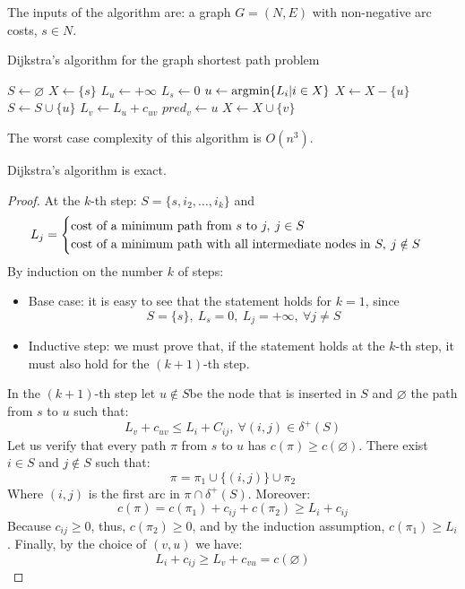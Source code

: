\documentclass[12pt, a4paper]{report}
\begin{document}
    The inputs of the algorithm are: a graph $G = (N, E)$ with non-negative arc costs, $s \in N$. 
    \begin{algorithm}[H]
        \caption{Dijkstra's algorithm for the graph shortest path problem}
            \begin{algorithmic}[1]
                \State $S \leftarrow \varnothing$
                \State $X \leftarrow \{s\}$
                    \State $L_u \leftarrow +\infty$
                \EndFor
                \State $L_s \leftarrow 0$
                    \State $u \leftarrow \textnormal{argmin}\{L_i|i \in X\}$
                    \State $X \leftarrow X-\{u\}$
                    \State $S \leftarrow S \cup \{u\}$
                        \State $L_v \leftarrow L_u+c_{uv}$
                        \State $pred_v \leftarrow u$
                        \State $X \leftarrow X \cup \{v\}$
                    \EndFor
                \EndWhile
            \end{algorithmic}
    \end{algorithm}
    The worst case complexity of this algorithm is $O(n^3)$. 
    \begin{proposition}
        Dijkstra's algorithm is exact. 
    \end{proposition}
    \begin{proof}
        At the $k$-th step: $S = \{s,i_2,\dots,i_k\}$ and 
        \[L_j=
        \begin{cases}
            \textnormal{cost of a minimum path from } s \textnormal{ to } j,\:j \in S \\ 
            \textnormal{cost of a minimum path with all intermediate nodes in } S, \: j \notin S
        \end{cases}
        \]
        By induction on the number $k$ of steps: 
        \begin{itemize}
            \item Base case: it is easy to see that the statement holds for $k = 1$, since 
                \[S=\{s\},\: L_s=0,\: L_j= +\infty,\: \forall j \neq S \]
            \item Inductive step: we must prove that, if the statement holds at the $k$-th step, it must also hold for the $(k + 1)$-th step. 
        \end{itemize}
        In the $(k + 1)$-th step let $u \notin S$be the node that is inserted in $S$ and $\varnothing$ the path from $s$ to $u$ such that:
        \[L_v + c_{uv} \leq L_i + C_{ij},\: \forall(i,j) \in \delta^{+}(S)\]
        Let us verify that every path $\pi$ from $s$ to $u$ has $c(\pi) \geq c(\varnothing)$. There exist $i \in S$ and $j \notin S$ such that: 
        \[\pi= \pi_1 \cup \{(i,j)\} \cup \pi_2\]
        Where $(i, j)$ is the first arc in $\pi \cap \delta^{+}(S)$. Moreover: 
        \[c(\pi) = c(\pi_1) + c_{ij} + c(\pi_2) \geq L_i + c_{ij}\]
        Because $c_{ij} \geq 0$, thus, $c(\pi_2) \geq 0$, and by the induction assumption, $c(\pi_1) \geq L_i$. Finally, by the choice of $(v,u)$ we have: 
        \[L_i + c_{ij} \geq L_v + c_{vu} = c(\varnothing)\]
    \end{proof}
\end{document}
